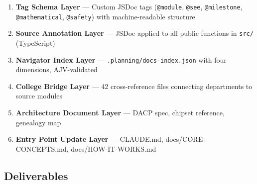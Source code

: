 \documentclass[11pt,letterpaper]{article}
\begin{document}
\begin{enumerate}
  \item \textbf{Tag Schema Layer} --- Custom JSDoc tags (\texttt{@module}, \texttt{@see}, \texttt{@milestone}, \texttt{@mathematical}, \texttt{@safety}) with machine-readable structure
  \item \textbf{Source Annotation Layer} --- JSDoc applied to all public functions in \texttt{src/} (TypeScript)
  \item \textbf{Navigator Index Layer} --- \texttt{.planning/docs-index.json} with four dimensions, AJV-validated
  \item \textbf{College Bridge Layer} --- 42 cross-reference files connecting departments to source modules
  \item \textbf{Architecture Document Layer} --- DACP spec, chipset reference, genealogy map
  \item \textbf{Entry Point Update Layer} --- CLAUDE.md, docs/CORE-CONCEPTS.md, docs/HOW-IT-WORKS.md
\end{enumerate}

\subsection{Deliverables}
\end{document}
